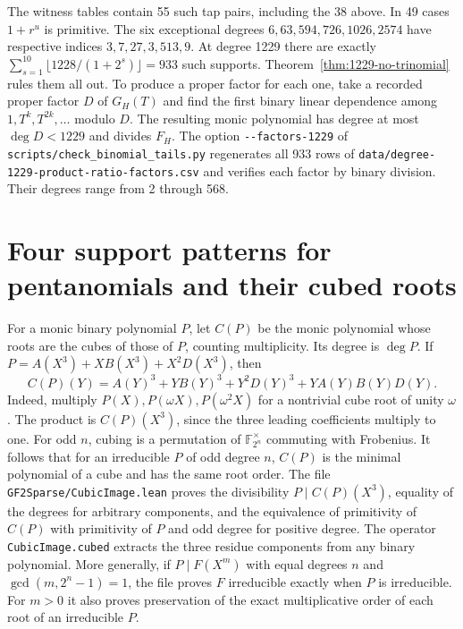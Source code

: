 \documentclass[11pt]{article}
\begin{document}
The witness tables contain 55 such tap pairs, including the 38 above.
In 49 cases \(1+r^u\) is primitive. The six exceptional degrees
\(6,63,594,726,1026,2574\) have respective indices
\(3,7,27,3,513,9\).
At degree 1229 there are exactly
\(\sum_{s=1}^{10}\lfloor1228/(1+2^s)\rfloor=933\) such supports.
Theorem~\ref{thm:1229-no-trinomial} rules them all out. To produce
a proper factor for each one, take a recorded proper factor \(D\)
of \(G_H(T)\) and find the first binary linear dependence among
\(1,T^k,T^{2k},\ldots\) modulo \(D\). The resulting monic polynomial
has degree at most \(\deg D<1229\) and divides \(F_H\).
The option \nolinkurl{--factors-1229} of
\nolinkurl{scripts/check_binomial_tails.py} regenerates all 933 rows of
\nolinkurl{data/degree-1229-product-ratio-factors.csv} and verifies each
factor by binary division. Their degrees range from 2 through 568.


\section{Four support patterns for pentanomials and their cubed roots}
\label{sec:cubed-supports}
For a monic binary polynomial \(P\), let \(C(P)\) be the monic polynomial
whose roots are the cubes of those of \(P\), counting multiplicity.
Its degree is \(\deg P\). If \(P=A(X^3)+XB(X^3)+X^2D(X^3)\), then
\[
 C(P)(Y)=A(Y)^3+YB(Y)^3+Y^2D(Y)^3+Y A(Y)B(Y)D(Y).
\]
Indeed, multiply \(P(X),P(\omega X),P(\omega^2 X)\) for a nontrivial
cube root of unity \(\omega\). The product is \(C(P)(X^3)\), since the
three leading coefficients multiply to one. For odd \(n\), cubing is
a permutation of \(\mathbb F_{2^n}^{\times}\) commuting with Frobenius.
It follows that for an irreducible \(P\) of odd degree \(n\), \(C(P)\)
is the minimal polynomial of a cube and has the same root order.
The file \nolinkurl{GF2Sparse/CubicImage.lean} proves the divisibility
\(P\mid C(P)(X^3)\), equality of the degrees for arbitrary components,
and the equivalence of primitivity of \(C(P)\) with primitivity of
\(P\) and odd degree for positive degree. The operator
\nolinkurl{CubicImage.cubed} extracts the three residue components from any
binary polynomial. More generally, if \(P\mid F(X^m)\) with equal degrees
\(n\) and \(\gcd(m,2^n-1)=1\), the file proves
\(F\) irreducible exactly when \(P\) is irreducible. For \(m>0\) it
also proves preservation of the exact multiplicative order of each
root of an irreducible \(P\).
\end{document}
